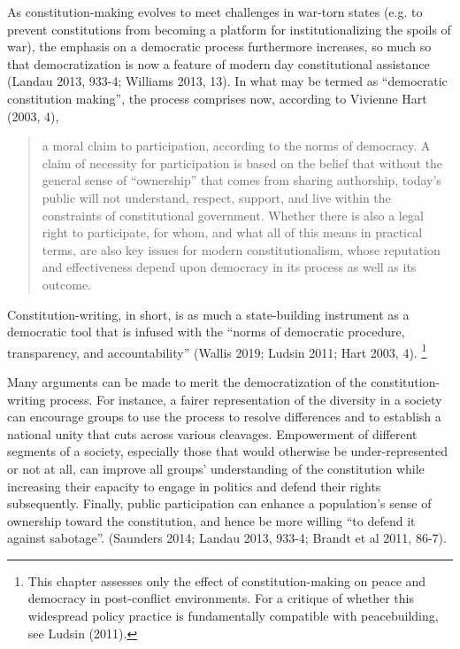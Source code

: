 \documentclass [11pt]{article}
\begin{document}
As constitution-making evolves to meet challenges in war-torn states (e.g. to prevent constitutions from becoming a platform for institutionalizing the spoils of war), the emphasis on a democratic process furthermore increases, so much so that democratization is now a feature of modern day constitutional assistance (Landau 2013, 933-4; Williams 2013, 13). In what may be termed as ``democratic constitution making'', the process comprises now, according to Vivienne Hart (2003, 4),

\begin{quote}
\small
a moral claim to participation, according to the norms of democracy. A claim of necessity for participation is based on the belief that without the general sense of ``ownership'' that comes from sharing authorship, today’s public will not understand, respect, support, and live within the constraints of constitutional government. Whether there is also a legal right to participate, for whom, and what all of this means in practical terms, are also key issues for modern constitutionalism, whose reputation and effectiveness
depend upon democracy in its process as well as its outcome.
\end{quote}

Constitution-writing, in short, is as much a state-building instrument as a democratic tool that is infused with the ``norms of democratic procedure, transparency, and accountability'' (Wallis 2019; Ludsin 2011; Hart 2003, 4). \footnote{This chapter assesses only the effect of constitution-making on peace and democracy in post-conflict environments. For a critique of whether this widespread policy practice is fundamentally compatible with peacebuilding, see Ludsin (2011).}

Many arguments can be made to merit the democratization of the constitution-writing process. For instance, a fairer representation of the diversity in a society can encourage groups to use the process to resolve differences and to establish a national unity that cuts across various cleavages. Empowerment of different segments of a society, especially those that would otherwise be under-represented or not at all, can improve all groups' understanding of the constitution while increasing their capacity to engage in politics and defend their rights subsequently. Finally, public participation can enhance a population's sense of ownership toward the constitution, and hence be more willing ``to defend it against sabotage''. (Saunders 2014; Landau 2013, 933-4; Brandt et al 2011, 86-7).
\end{document}

